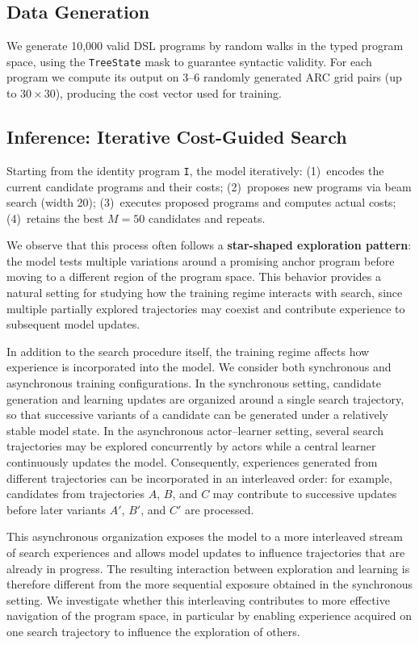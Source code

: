 \documentclass[final]{nesy2027}
\begin{document}
\subsection{Data Generation}
\label{sec:data}

We generate 10{,}000 valid DSL programs by random walks in the typed program
space, using the \texttt{TreeState} mask to guarantee syntactic validity.
For each program we compute its output on 3--6 randomly generated ARC grid pairs
(up to $30\times30$), producing the cost vector used for training.

\subsection{Inference: Iterative Cost-Guided Search}
\label{sec:inference}

Starting from the identity program \texttt{I}, the model iteratively:
(1)~encodes the current candidate programs and their costs;
(2)~proposes new programs via beam search (width 20);
(3)~executes proposed programs and computes actual costs;
(4)~retains the best $M=50$ candidates and repeats.

We observe that this process often follows a \textbf{star-shaped exploration
pattern}: the model tests multiple variations around a promising anchor program before
moving to a different region of the program space. This behavior provides a natural setting
for studying how the training regime interacts with search, since multiple partially explored
trajectories may coexist and contribute experience to subsequent model updates.

In addition to the search procedure itself, the training regime affects how experience is incorporated
into the model. We consider both synchronous and asynchronous training configurations. In the synchronous
setting, candidate generation and learning updates are organized around a single search trajectory, so
that successive variants of a candidate can be generated under a relatively stable model state. In the
asynchronous actor--learner setting, several search trajectories may be explored concurrently by actors
while a central learner continuously updates the model. Consequently, experiences generated from different
trajectories can be incorporated in an interleaved order: for example, candidates from trajectories $A$, $B$,
and $C$ may contribute to successive updates before later variants $A'$, $B'$, and $C'$ are processed.

This asynchronous organization exposes the model to a more interleaved stream of search experiences and allows
model updates to influence trajectories that are already in progress. The resulting interaction between exploration
and learning is therefore different from the more sequential exposure obtained in the synchronous setting.
We investigate whether this interleaving contributes to more effective navigation of the program space, in
particular by enabling experience acquired on one search trajectory to influence the exploration of others.
\end{document}
